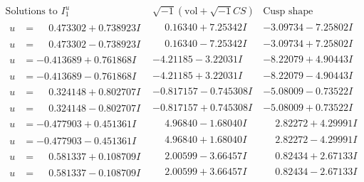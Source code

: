 \documentclass[1p]{elsarticle_modified}
\theoremstyle{definition}
\newcommand{\I}{\sqrt{-1}}
\begin{document}
$$\begin{array}{c|c|c}  
\text{Solutions to }I^u_{1}& \I (\text{vol} + \sqrt{-1}CS) & \text{Cusp shape}\\
 \hline 
\begin{aligned}
u &= \phantom{-}0.473302 + 0.738923 I\end{aligned}
 & \phantom{-}0.16340 + 7.25342 I & -3.09734 - 7.25802 I \\ \hline\begin{aligned}
u &= \phantom{-}0.473302 - 0.738923 I\end{aligned}
 & \phantom{-}0.16340 - 7.25342 I & -3.09734 + 7.25802 I \\ \hline\begin{aligned}
u &= -0.413689 + 0.761868 I\end{aligned}
 & -4.21185 - 3.22031 I & -8.22079 + 4.90443 I \\ \hline\begin{aligned}
u &= -0.413689 - 0.761868 I\end{aligned}
 & -4.21185 + 3.22031 I & -8.22079 - 4.90443 I \\ \hline\begin{aligned}
u &= \phantom{-}0.324148 + 0.802707 I\end{aligned}
 & -0.817157 - 0.745308 I & -5.08009 - 0.73522 I \\ \hline\begin{aligned}
u &= \phantom{-}0.324148 - 0.802707 I\end{aligned}
 & -0.817157 + 0.745308 I & -5.08009 + 0.73522 I \\ \hline\begin{aligned}
u &= -0.477903 + 0.451361 I\end{aligned}
 & \phantom{-}4.96840 - 1.68040 I & \phantom{-}2.82272 + 4.29991 I \\ \hline\begin{aligned}
u &= -0.477903 - 0.451361 I\end{aligned}
 & \phantom{-}4.96840 + 1.68040 I & \phantom{-}2.82272 - 4.29991 I \\ \hline\begin{aligned}
u &= \phantom{-}0.581337 + 0.108709 I\end{aligned}
 & \phantom{-}2.00599 - 3.66457 I & \phantom{-}0.82434 + 2.67133 I \\ \hline\begin{aligned}
u &= \phantom{-}0.581337 - 0.108709 I\end{aligned}
 & \phantom{-}2.00599 + 3.66457 I & \phantom{-}0.82434 - 2.67133 I \\ \hline\begin{aligned}

\end{aligned}
\end{array}$$
\end{document}
